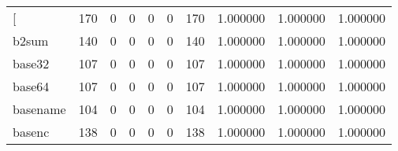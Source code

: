 \begin{longtable}{lrrrrrrrrr}
\bottomrule
\endlastfoot
{[}         &                                                170 &                                                  0 &                                                  0 &                                                  0 &                                                  0 &                                                170 &                                           1.000000 &                               1.000000 &                             1.000000 \\
b2sum     &                                                140 &                                                  0 &                                                  0 &                                                  0 &                                                  0 &                                                140 &                                           1.000000 &                               1.000000 &                             1.000000 \\
base32    &                                                107 &                                                  0 &                                                  0 &                                                  0 &                                                  0 &                                                107 &                                           1.000000 &                               1.000000 &                             1.000000 \\
base64    &                                                107 &                                                  0 &                                                  0 &                                                  0 &                                                  0 &                                                107 &                                           1.000000 &                               1.000000 &                             1.000000 \\
basename  &                                                104 &                                                  0 &                                                  0 &                                                  0 &                                                  0 &                                                104 &                                           1.000000 &                               1.000000 &                             1.000000 \\
basenc    &                                                138 &                                                  0 &                                                  0 &                                                  0 &                                                  0 &                                                138 &                                           1.000000 &                               1.000000 &                             1.000000 \\

\end{longtable}

